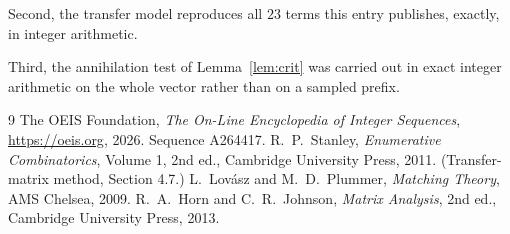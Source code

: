 \documentclass[11pt,a4paper]{article}
\theoremstyle{plain}
\theoremstyle{definition}
\begin{document}
Second, the transfer model reproduces all $23$ terms this entry publishes, exactly, in
integer arithmetic.

Third, the annihilation test of Lemma~\ref{lem:crit} was carried out in exact integer
arithmetic on the whole vector rather than on a sampled prefix.

\begin{thebibliography}{9}
 The OEIS Foundation, \emph{The On-Line Encyclopedia of Integer
Sequences}, \url{https://oeis.org}, 2026. Sequence A264417.
 R.~P.~Stanley, \emph{Enumerative Combinatorics}, Volume 1, 2nd ed.,
Cambridge University Press, 2011. (Transfer-matrix method, Section 4.7.)
 L.~Lov\'asz and M.~D.~Plummer, \emph{Matching Theory}, AMS Chelsea, 2009.
 R.~A.~Horn and C.~R.~Johnson, \emph{Matrix Analysis}, 2nd ed., Cambridge
University Press, 2013.
\end{thebibliography}
\end{document}
